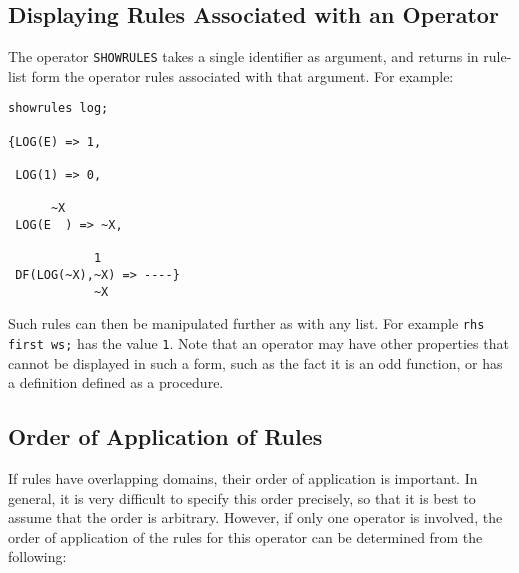 \subsection*{Displaying Rules Associated with an Operator}
\hypertarget{operator:SHOWRULES}{}

The operator {\tt SHOWRULES} takes a single identifier
as argument, and returns in rule-list form the operator rules associated
with that argument.  For example:
\begin{verbatim}
showrules log;

{LOG(E) => 1,

 LOG(1) => 0,

      ~X
 LOG(E  ) => ~X,

		    1
 DF(LOG(~X),~X) => ----}
		    ~X
\end{verbatim}

Such rules can then be manipulated further as with any list.  For example
{\tt rhs first ws;} has the value {\tt 1}.  Note that an operator may
have other properties that cannot be displayed in such a form, such as the
fact it is an odd function, or has a definition defined as a procedure.

\subsection*{Order of Application of Rules}

If rules have overlapping domains, their order of application is
important.  In general, it is very difficult to specify this order
precisely, so that it is best to assume that the order is arbitrary.
However, if only one operator is involved, the order of application of the
rules for this operator can be determined from the following:

